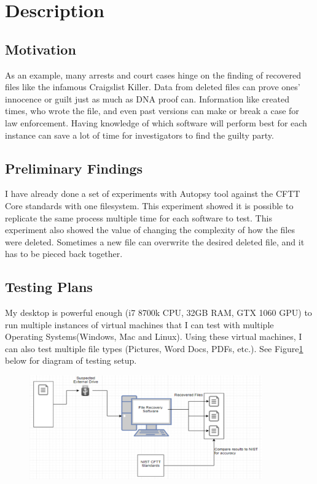 \section{Description}
\subsection{Motivation}
As an example, many arrests and court cases hinge on the finding of recovered files like the infamous Craigslist 
Killer. Data from deleted files can prove ones’ innocence or guilt just as much as DNA proof can. Information 
like created times, who wrote the file, and even past versions can make or break a case for law enforcement. 
Having knowledge of which software will perform best for each instance can save a lot of time for investigators to find the guilty party.

\subsection{Preliminary Findings}
I have already done a set of experiments with Autopsy tool against the CFTT Core standards with one filesystem. 
This experiment showed it is possible to replicate the same process multiple time for each software to test. 
This experiment also showed the value of changing the complexity of how the files were deleted. 
Sometimes a new file can overwrite the desired deleted file, and it has to be pieced back together. 

\subsection{Testing Plans}
My desktop is powerful enough (i7 8700k CPU, 32GB RAM, GTX 1060 GPU) to run multiple instances of virtual machines 
that I can test with multiple Operating Systems(Windows, Mac and Linux). Using these virtual machines, I can also test multiple file types 
(Pictures, Word Docs, PDFs, etc.). See Figure\ref{fig1} below for diagram of testing setup.


\begin{figure}[t] \label{fig1}
\includegraphics[width=10cm]{./figs/fig1.png}
\centering
\end{figure}


